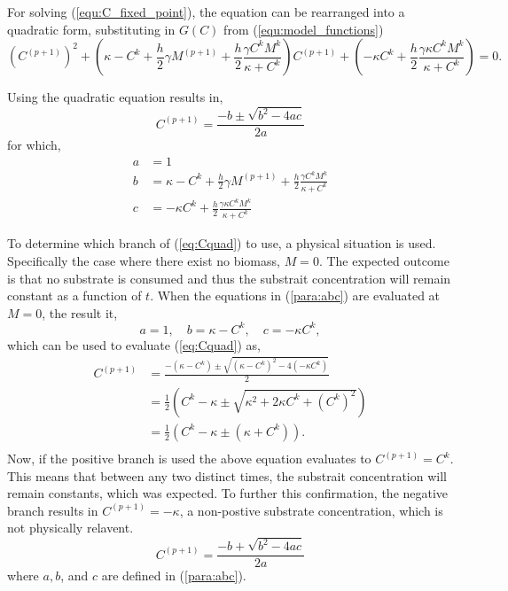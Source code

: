 
For solving (\ref{equ:C_fixed_point}), the equation can be rearranged into a quadratic form, substituting in $G(C)$ from (\ref{equ:model_functions})
\begin{equation}
  \left(C^{(p+1)}\right)^2 + \left( \kappa - C^k + \frac{h}{2} \gamma M^{(p+1)} + \frac{h}{2} \frac{ \gamma C^k M^k}{\kappa + C^k} \right) C^{(p+1)} + \left( -\kappa C^k + \frac{h}{2} \frac{\gamma \kappa C^k M^k}{\kappa + C^k} \right) = 0.
\end{equation}

Using the quadratic equation results in, 
  \begin{equation} \label{eq:Cquad}
    C^{(p+1)} = \frac{-b \pm \sqrt{b^2 - 4ac}}{2a}
  \end{equation}  
  for which, 
  \begin{equation} \begin{aligned} \label{para:abc}
    a &= 1\\
    b &= \kappa - C^k + \frac{h}{2} \gamma M^{(p+1)} + \frac{h}{2} \frac{\gamma C^k M^k}{\kappa + C^k} \\
    c &= -\kappa C^k + \frac{h}{2} \frac{\gamma \kappa C^k M^k}{\kappa + C^k}
  \end{aligned}  \end{equation}
  
  To determine which branch of (\ref{eq:Cquad}) to use, a physical situation is used. 
  Specifically the case where there exist no biomass, $M = 0$. 
  The expected outcome is that no substrate is consumed and thus the substrait concentration will remain constant as a function of $t$. 
  When the equations in (\ref{para:abc}) are evaluated at $M = 0$, the result it,
  \begin{equation}
    a = 1, \quad b = \kappa - C^k, \quad c = -\kappa C^k,
  \end{equation} 
  which can be used to evaluate (\ref{eq:Cquad}) as,
  \begin{equation} \begin{aligned}
    C^{(p+1)} &= \frac{- (\kappa - C^k) \pm \sqrt{(\kappa - C^k)^2 - 4 (-\kappa C^k)}}{2} \\
      &= \frac{1}{2} \left( C^k - \kappa \pm \sqrt{\kappa^2 + 2 \kappa C^k + \left(C^k \right) ^2}\right) \\
      &= \frac{1}{2} \left( C^k - \kappa \pm (\kappa+C^k) \right). \\
  \end{aligned} \end{equation}
  Now, if the positive branch is used the above equation evaluates to $C^{(p+1)} = C^k$. 
  This means that between any two distinct times, the substrait concentration will remain constants, which was expected. 
  To further this confirmation, the negative branch results in $C^{(p+1)} = -\kappa $, a non-postive substrate concentration, which is not physically relavent. 
  \begin{equation}
    C^{(p+1)} = \frac{-b + \sqrt{b^2 - 4ac}}{2a}
  \end{equation} 
  where $a,b$, and $c$ are defined in (\ref{para:abc}).



